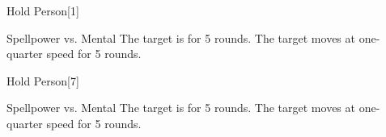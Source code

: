 \begin{spellsection}{Hold Person}[1]
    \begin{spellheader}
    \end{spellheader}
    \begin{spellcontent}
        \begin{spelltargetinginfo}
        \end{spelltargetinginfo}
        \begin{spelleffects}
            \begin{spellattack}{Spellpower vs. Mental}
                \spellsuccess The target is \immobilized for 5 rounds.
                \spellfailure The target moves at one-quarter speed for 5 rounds.
            \end{spellattack}
        \end{spelleffects}
    \end{spellcontent}
    \begin{spellfooter}
        \miscastrandom
    \end{spellfooter}
\end{spellsection}

\begin{spellsection}[Mass]{Hold Person}[7]
    \begin{spellheader}
    \end{spellheader}
    \begin{spellcontent}
        \begin{spelltargetinginfo}
        \end{spelltargetinginfo}
        \begin{spelleffects}
            \begin{spellattack}{Spellpower vs. Mental}
                \spellsuccess The target is \immobilized for 5 rounds.
                \spellfailure The target moves at one-quarter speed for 5 rounds.
            \end{spellattack}
        \end{spelleffects}
    \end{spellcontent}
    \begin{spellfooter}
        \miscastexplode
    \end{spellfooter}
\end{spellsection}

